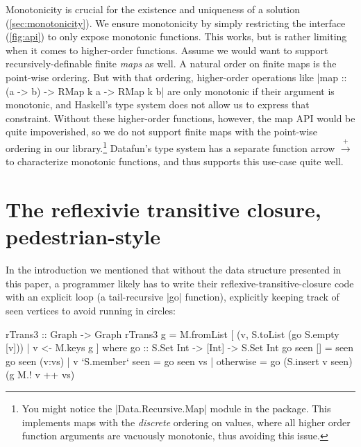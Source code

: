 \documentclass[manuscript,anonymous,screen,acmsmall]{acmart}
\begin{document}
Monotonicity is crucial for the existence and uniqueness of a solution (\cref{sec:monotonicity}). We ensure monotonicity by simply restricting the interface (\cref{fig:api}) to only expose monotonic functions. This works, but is rather limiting when it comes to higher-order functions. Assume we would want to support recursively-definable finite \emph{maps} as well. A natural order on finite maps is the point-wise ordering. But with that ordering, higher-order operations like |map :: (a -> b) -> RMap k a -> RMap k b| are only monotonic if their argument is monotonic, and Haskell's type system does not allow us to express that constraint. Without these higher-order functions, however, the map API would be quite impoverished, so we do not support finite maps with the point-wise ordering in our library.\footnote{You might notice the |Data.Recursive.Map| module in the package. This implements maps with the \emph{discrete} ordering on values, where all higher order function arguments are vacuously monotonic, thus avoiding this issue.} Datafun's type system has a separate function arrow $\xrightarrow{+}$ to characterize monotonic functions, and thus supports this use-case quite well.





\clearpage
\appendix
\section{The reflexivie transitive closure, pedestrian-style}\label{sec:imp}

In the introduction we mentioned that without the data structure presented in this paper, a programmer likely has to write their reflexive-transitive-closure code with an explicit loop (a tail-recursive |go| function), explicitly keeping track of seen vertices to avoid running in circles:
\begin{code}
rTrans3 :: Graph -> Graph
rTrans3 g = M.fromList [ (v, S.toList (go S.empty [v])) | v <- M.keys g ]
  where
    go :: S.Set Int -> [Int] -> S.Set Int
    go seen [] = seen
    go seen (v:vs)  |  v `S.member` seen  =  go seen vs
                    |  otherwise          =  go (S.insert v seen) (g M.! v ++ vs)
\end{code}
\end{document}
